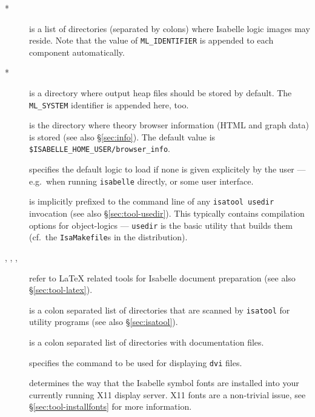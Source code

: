\begin{description}
\item[*] is a list of directories (separated by colons)
  where Isabelle logic images may reside. Note that the value of
  \texttt{ML_IDENTIFIER} is appended to each component automatically.

\item[*] is a directory where output heap
  files should be stored by default. The \texttt{ML_SYSTEM} identifier
  is appended here, too.

\item[] is the directory where theory
  browser information (HTML and graph data) is stored (see also
  \S\ref{sec:info}).  The default value is
  \texttt{\$ISABELLE_HOME_USER/browser_info}.

\item[] specifies the default logic to load if
  none is given explicitely by the user --- e.g.\ when running
  \texttt{isabelle} directly, or some user interface.

\item[] is implicitly prefixed to the
  command line of any \texttt{isatool usedir} invocation (see also
  \S\ref{sec:tool-usedir}). This typically contains compilation
  options for object-logics --- \texttt{usedir} is the basic utility
  that builds them (cf.\ the \texttt{IsaMakefile}s in the
  distribution).
  
\item[, ,
  , ] refer to {\LaTeX} related
  tools for Isabelle document preparation (see also \S\ref{sec:tool-latex}).

\item[] is a colon separated list of
  directories that are scanned by \texttt{isatool} for utility
  programs (see also \S\ref{sec:isatool}).

\item[] is a colon separated list of directories
  with documentation files.

\item[] specifies the command to be used for
  displaying \texttt{dvi} files.

\item[] determines the way that the
  Isabelle symbol fonts are installed into your currently running X11
  display server. X11 fonts are a non-trivial issue, see
  \S\ref{sec:tool-installfonts} for more information.


\end{description}
